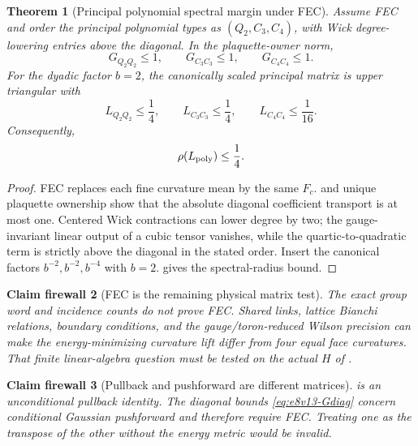 \documentclass[11pt,oneside]{book}
\newtheorem{theorem}{Theorem}[chapter]
\newtheorem{firewall}[theorem]{Claim firewall}
\theoremstyle{definition}
\theoremstyle{remark}
\begin{document}
\begin{theorem}[Principal polynomial spectral margin under FEC]
\label{thm:e8v13-principal-margin}
Assume FEC and order the principal polynomial types as
\((Q_2,C_3,C_4)\), with Wick degree-lowering entries above the
diagonal.  In the plaquette-owner norm,
\[
 G_{Q_2Q_2}\le1,\qquad
 G_{C_3C_3}\le1,\qquad
 G_{C_4C_4}\le1.                                   \label{eq:e8v13-Gdiag}
\]
For the dyadic factor \(b=2\), the canonically scaled principal matrix
is upper triangular with
\[
 L_{Q_2Q_2}\le\frac14,\qquad
 L_{C_3C_3}\le\frac14,\qquad
 L_{C_4C_4}\le\frac1{16}.                           \label{eq:e8v13-Ldiag}
\]
Consequently,
\[
 \rho(L_{\rm poly})\le\frac14.                      \label{eq:e8v13-rho-quarter}
\]
\end{theorem}

\begin{proof}
FEC replaces each fine curvature mean by the same \(F_c\).
 and unique plaquette ownership show that
the absolute diagonal coefficient transport is at most one.
Centered Wick contractions can lower degree by two; the
gauge-invariant linear output of a cubic tensor vanishes, while the
quartic-to-quadratic term is strictly above the diagonal in the stated
order.  Insert the canonical factors
\(b^{-2},b^{-2},b^{-4}\) with \(b=2\).
 gives the spectral-radius bound.
\end{proof}

\begin{firewall}[FEC is the remaining physical matrix test]
\label{fire:e8v13-FEC}
The exact group word and incidence counts do not prove FEC.  Shared
links, lattice Bianchi relations, boundary conditions, and the
gauge/toron-reduced Wilson precision can make the energy-minimizing
curvature lift differ from four equal face curvatures.  That finite
linear-algebra question must be tested on the actual \(H\) of
.
\end{firewall}

\begin{firewall}[Pullback and pushforward are different matrices]
\label{fire:e8v13-transpose}
 is an unconditional pullback
identity.  The diagonal bounds
\eqref{eq:e8v13-Gdiag} concern conditional Gaussian pushforward and
therefore require FEC.  Treating one as the transpose of the other
without the energy metric would be invalid.
\end{firewall}
\end{document}
